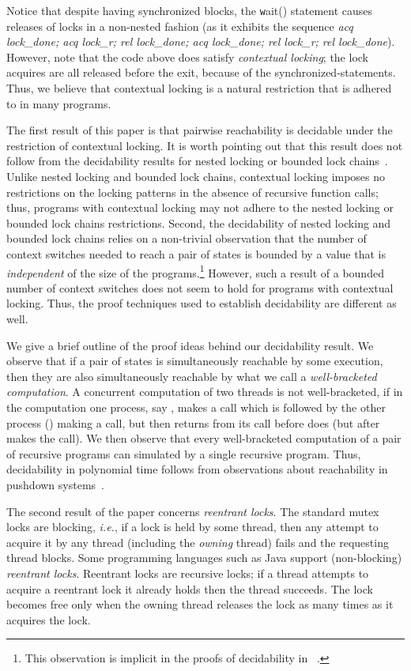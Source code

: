 \documentclass{LMCS}
\begin{document}
Notice that despite having synchronized blocks, the {\texttt wait()}
statement causes releases of locks in a non-nested fashion (as it
exhibits the sequence \emph{acq lock\_done; acq lock\_r; rel
  lock\_done; acq lock\_done; rel lock\_r; rel lock\_done}).
However, note that the code above does satisfy \emph{contextual
  locking}; the lock  acquires are all released before the exit,
because of the synchronized-statements. Thus, we believe that
contextual locking is a natural restriction that is adhered to
in many programs.

The first result of this paper is that pairwise reachability is
decidable under the restriction of contextual locking. It is worth
pointing out that this result does not follow from the decidability
results for nested locking or bounded lock
chains~\cite{kig05,kah09}. Unlike nested locking and bounded lock
chains, contextual locking imposes no restrictions on the locking
patterns in the absence of recursive function calls; thus, programs
with contextual locking may not adhere to the nested locking or
bounded lock chains restrictions.  Second, the decidability of nested
locking and bounded lock chains relies on a non-trivial observation
that the number of context switches needed to reach a pair of states
is bounded by a value that is \emph{independent} of the size of the
programs.\footnote{This observation is implicit in the proofs of decidability in~ \cite{kig05,kah09}.} However, such a result of a bounded number of context
switches does not seem to hold for programs with contextual locking. Thus, the
proof techniques used to establish decidability are different as well.

We give a brief outline of the proof ideas
behind our decidability result. We observe that if a pair of states is
simultaneously reachable by some execution, then they are also
simultaneously reachable by what we call a \emph{well-bracketed
  computation}. A concurrent computation of two threads is not well-bracketed, if in the computation one process, say , makes a
call which is followed by the other process () making a call,
but then  returns from its call before  does (but after
 makes the call). We then observe that every well-bracketed
computation of a pair of recursive programs can simulated by a single
recursive program. Thus, decidability in polynomial time follows from
observations about reachability in pushdown systems~\cite{bem97}.


The second result of the paper concerns  \emph{reentrant  locks}. The standard mutex locks are blocking, \emph{i.e.}, if a
lock is held by some thread, then any attempt to acquire it by any thread (including the \emph{owning} thread) fails and the requesting thread blocks. 
Some programming languages such as Java support  (non-blocking)  \emph{reentrant  locks}.
Reentrant locks are recursive locks;  if a thread attempts to acquire a reentrant lock it already holds 
then the thread succeeds.  The lock becomes free only when the owning thread releases the lock as many times as
it acquires the lock. 
\end{document}
